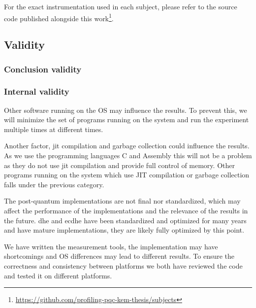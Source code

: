 For the exact instrumentation used in each subject, please refer to the source code published alongside this work\footnote{\href{https://github.com/profiling-pqc-kem-thesis/subjects}{https://github.com/profiling-pqc-kem-thesis/subjects}}.

\subsection{Validity}

\subsubsection{Conclusion validity}


\subsubsection{Internal validity}
\label{section:method:internal-validity}
Other software running on the OS may influence the results. To prevent this, we will minimize the set of programs running on the system and run the experiment multiple times at different times.

Another factor, \gls{jit} compilation and garbage collection could influence the results. As we use the programming languages C and Assembly this will not be a problem as they do not use \gls{jit} compilation and provide full control of memory. Other programs running on the system which use JIT compilation or garbage collection falls under the previous category.




The post-quantum implementations are not final nor standardized, which may affect the performance of the implementations and the relevance of the results in the future. \gls{dhe} and \gls{ecdhe} have been standardized and optimized for many years and have mature implementations, they are likely fully optimized by this point.

We have written the measurement tools, the implementation may have shortcomings and OS differences may lead to different results. To ensure the correctness and consistency between platforms we both have reviewed the code and tested it on different platforms.

